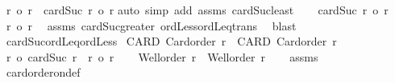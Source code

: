 \begin{isabellebody}
\ {\isachardoublequoteopen}{\isacharparenleft}{\kern0pt}r\ {\isacharless}{\kern0pt}o\ r{\isacharprime}{\kern0pt}{\isacharparenright}{\kern0pt}\ {\isacharequal}{\kern0pt}\ {\isacharparenleft}{\kern0pt}cardSuc\ r\ {\isasymle}o\ r{\isacharprime}{\kern0pt}{\isacharparenright}{\kern0pt}{\isachardoublequoteclose}\isanewline
%
\isadelimproof
%
\endisadelimproof
%
\isatagproof
{}\isamarkupfalse%
{\isacharparenleft}{\kern0pt}auto\ simp\ add{\isacharcolon}{\kern0pt}\ assms\ cardSuc{\isacharunderscore}{\kern0pt}least{\isacharparenright}{\kern0pt}\isanewline
\ \ \isamarkupfalse%
\ {\isachardoublequoteopen}cardSuc\ r\ {\isasymle}o\ r{\isacharprime}{\kern0pt}{\isachardoublequoteclose}\isanewline
\ \ \isamarkupfalse%
\ {\isachardoublequoteopen}r\ {\isacharless}{\kern0pt}o\ r{\isacharprime}{\kern0pt}{\isachardoublequoteclose}\ \isamarkupfalse%
\ assms\ cardSuc{\isacharunderscore}{\kern0pt}greater\ ordLess{\isacharunderscore}{\kern0pt}ordLeq{\isacharunderscore}{\kern0pt}trans\ \isamarkupfalse%
\ blast\isanewline
{}\isamarkupfalse%
%
\endisatagproof
{\isafoldproof}%
%
\isadelimproof
\isanewline
%
\endisadelimproof
\isanewline
{}\isamarkupfalse%
\ cardSuc{\isacharunderscore}{\kern0pt}ordLeq{\isacharunderscore}{\kern0pt}ordLess{\isacharcolon}{\kern0pt}\isanewline
{}\ CARD{\isacharcolon}{\kern0pt}\ {\isachardoublequoteopen}Card{\isacharunderscore}{\kern0pt}order\ r{\isachardoublequoteclose}\ \ CARD{\isacharprime}{\kern0pt}{\isacharcolon}{\kern0pt}\ {\isachardoublequoteopen}Card{\isacharunderscore}{\kern0pt}order\ r{\isacharprime}{\kern0pt}{\isachardoublequoteclose}\isanewline
{}\ {\isachardoublequoteopen}{\isacharparenleft}{\kern0pt}r{\isacharprime}{\kern0pt}\ {\isacharless}{\kern0pt}o\ cardSuc\ r{\isacharparenright}{\kern0pt}\ {\isacharequal}{\kern0pt}\ {\isacharparenleft}{\kern0pt}r{\isacharprime}{\kern0pt}\ {\isasymle}o\ r{\isacharparenright}{\kern0pt}{\isachardoublequoteclose}\isanewline
%
\isadelimproof
%
\endisadelimproof
%
\isatagproof
{}\isamarkupfalse%
{\isacharminus}{\kern0pt}\isanewline
\ \ \isamarkupfalse%
\ {\isachardoublequoteopen}Well{\isacharunderscore}{\kern0pt}order\ r\ {\isasymand}\ Well{\isacharunderscore}{\kern0pt}order\ r{\isacharprime}{\kern0pt}{\isachardoublequoteclose}\isanewline
\ \ \isamarkupfalse%
\ assms\ \isamarkupfalse%
\ card{\isacharunderscore}{\kern0pt}order{\isacharunderscore}{\kern0pt}on{\isacharunderscore}{\kern0pt}def\ \isamarkupfalse%

\end{isabellebody}
